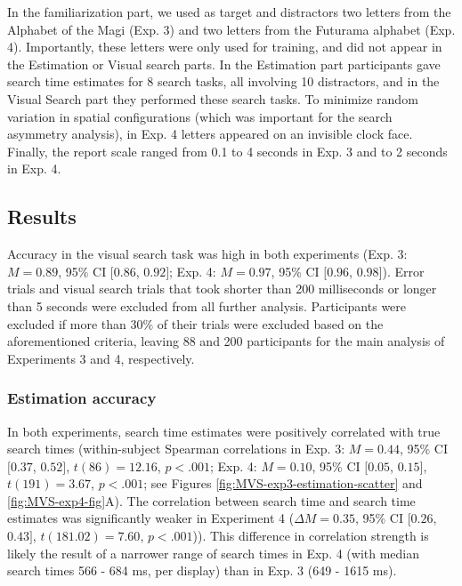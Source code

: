 \documentclass[12pt,twoside]{reedthesis}
\begin{document}
In the familiarization part, we used as target and distractors two letters from the Alphabet of the Magi (Exp. 3) and two letters from the Futurama alphabet (Exp. 4). Importantly, these letters were only used for training, and did not appear in the Estimation or Visual search parts. In the Estimation part participants gave search time estimates for 8 search tasks, all involving 10 distractors, and in the Visual Search part they performed these search tasks. To minimize random variation in spatial configurations (which was important for the search asymmetry analysis), in Exp. 4 letters appeared on an invisible clock face. Finally, the report scale ranged from 0.1 to 4 seconds in Exp. 3 and to 2 seconds in Exp. 4.

\hypertarget{results-3}{%
\subsection{Results}\label{results-3}}

Accuracy in the visual search task was high in both experiments (Exp. 3: \(M = 0.89\), 95\% CI \([0.86\), \(0.92]\); Exp. 4: \(M = 0.97\), 95\% CI \([0.96\), \(0.98]\)).
Error trials and visual search trials that took shorter than 200 milliseconds or longer than 5 seconds were excluded from all further analysis. Participants were excluded if more than 30\% of their trials were excluded based on the aforementioned criteria, leaving 88 and 200 participants for the main analysis of Experiments 3 and 4, respectively.

\hypertarget{estimation-accuracy-1}{%
\subsubsection*{Estimation accuracy}\label{estimation-accuracy-1}}

In both experiments, search time estimates were positively correlated with true search times (within-subject Spearman correlations in Exp. 3: \(M = 0.44\), 95\% CI \([0.37\), \(0.52]\), \(t(86) = 12.16\), \(p < .001\); Exp. 4: \(M = 0.10\), 95\% CI \([0.05\), \(0.15]\), \(t(191) = 3.67\), \(p < .001\); see Figures \ref{fig:MVS-exp3-estimation-scatter} and \ref{fig:MVS-exp4-fig}A). The correlation between search time and search time estimates was significantly weaker in Experiment 4 (\(\Delta M = 0.35\), 95\% CI \([0.26\), \(0.43]\), \(t(181.02) = 7.60\), \(p < .001\))). This difference in correlation strength is likely the result of a narrower range of search times in Exp. 4 (with median search times 566 - 684 ms, per display) than in Exp. 3 (649 - 1615 ms).
\end{document}
